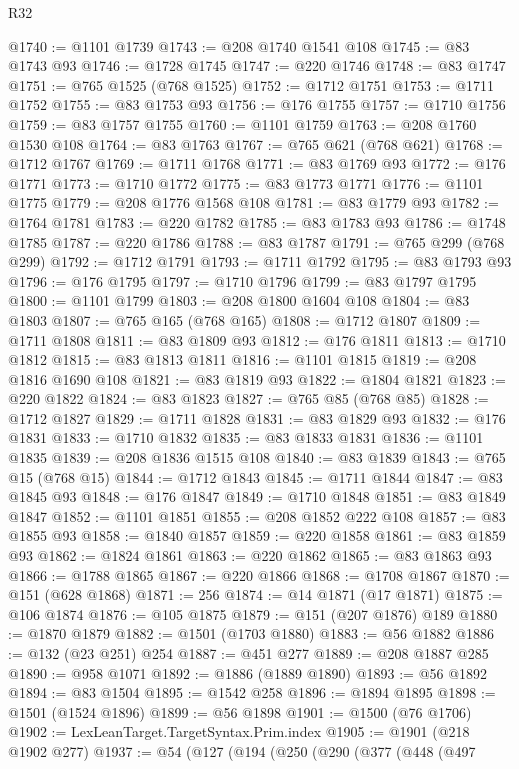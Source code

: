 \begin{lexlean}{R32}
\begin{coremodule}
@1740 := @1101 @1739
@1743 := @208 @1740 @1541 @108
@1745 := @83 @1743 @93
@1746 := @1728 @1745
@1747 := @220 @1746
@1748 := @83 @1747
@1751 := @765 @1525 (@768 @1525)
@1752 := @1712 @1751
@1753 := @1711 @1752
@1755 := @83 @1753 @93
@1756 := @176 @1755
@1757 := @1710 @1756
@1759 := @83 @1757 @1755
@1760 := @1101 @1759
@1763 := @208 @1760 @1530 @108
@1764 := @83 @1763
@1767 := @765 @621 (@768 @621)
@1768 := @1712 @1767
@1769 := @1711 @1768
@1771 := @83 @1769 @93
@1772 := @176 @1771
@1773 := @1710 @1772
@1775 := @83 @1773 @1771
@1776 := @1101 @1775
@1779 := @208 @1776 @1568 @108
@1781 := @83 @1779 @93
@1782 := @1764 @1781
@1783 := @220 @1782
@1785 := @83 @1783 @93
@1786 := @1748 @1785
@1787 := @220 @1786
@1788 := @83 @1787
@1791 := @765 @299 (@768 @299)
@1792 := @1712 @1791
@1793 := @1711 @1792
@1795 := @83 @1793 @93
@1796 := @176 @1795
@1797 := @1710 @1796
@1799 := @83 @1797 @1795
@1800 := @1101 @1799
@1803 := @208 @1800 @1604 @108
@1804 := @83 @1803
@1807 := @765 @165 (@768 @165)
@1808 := @1712 @1807
@1809 := @1711 @1808
@1811 := @83 @1809 @93
@1812 := @176 @1811
@1813 := @1710 @1812
@1815 := @83 @1813 @1811
@1816 := @1101 @1815
@1819 := @208 @1816 @1690 @108
@1821 := @83 @1819 @93
@1822 := @1804 @1821
@1823 := @220 @1822
@1824 := @83 @1823
@1827 := @765 @85 (@768 @85)
@1828 := @1712 @1827
@1829 := @1711 @1828
@1831 := @83 @1829 @93
@1832 := @176 @1831
@1833 := @1710 @1832
@1835 := @83 @1833 @1831
@1836 := @1101 @1835
@1839 := @208 @1836 @1515 @108
@1840 := @83 @1839
@1843 := @765 @15 (@768 @15)
@1844 := @1712 @1843
@1845 := @1711 @1844
@1847 := @83 @1845 @93
@1848 := @176 @1847
@1849 := @1710 @1848
@1851 := @83 @1849 @1847
@1852 := @1101 @1851
@1855 := @208 @1852 @222 @108
@1857 := @83 @1855 @93
@1858 := @1840 @1857
@1859 := @220 @1858
@1861 := @83 @1859 @93
@1862 := @1824 @1861
@1863 := @220 @1862
@1865 := @83 @1863 @93
@1866 := @1788 @1865
@1867 := @220 @1866
@1868 := @1708 @1867
@1870 := @151 (@628 @1868)
@1871 := 256
@1874 := @14 @1871 (@17 @1871)
@1875 := @106 @1874
@1876 := @105 @1875
@1879 := @151 (@207 @1876) @189
@1880 := @1870 @1879
@1882 := @1501 (@1703 @1880)
@1883 := @56 @1882
@1886 := @132 (@23 @251) @254
@1887 := @451 @277
@1889 := @208 @1887 @285
@1890 := @958 @1071
@1892 := @1886 (@1889 @1890)
@1893 := @56 @1892
@1894 := @83 @1504
@1895 := @1542 @258
@1896 := @1894 @1895
@1898 := @1501 (@1524 @1896)
@1899 := @56 @1898
@1901 := @1500 (@76 @1706)
@1902 := LexLeanTarget.TargetSyntax.Prim.index
@1905 := @1901 (@218 @1902 @277)
@1937 := @54
    (@127
      (@194
        (@250
          (@290
            (@377
              (@448
                (@497

\end{coremodule}
\end{lexlean}
